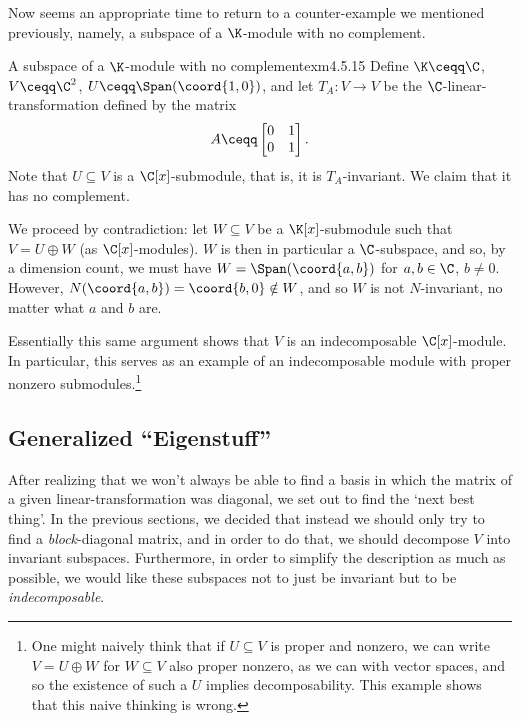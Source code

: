 Now seems an appropriate time to return to a counter-example we mentioned previously, namely, a subspace of a $\K$-module with no complement.
\begin{exm}{A subspace of a $\K$-module with no complement}{exm4.5.15}
	Define $\K \ceqq \C$, $V\ceqq \C ^2$, $U\ceqq \Span (\coord{1,0})$, and let $T_A\colon V\rightarrow V$ be the $\C$-linear-transformation defined by the matrix
	\begin{equation}
		A\ceqq \begin{bmatrix}0 & 1 \\ 0 & 1\end{bmatrix}.
	\end{equation}
	Note that $U\subseteq V$ is a $\C [x]$-submodule, that is, it is $T_A$-invariant.  We claim that it has no complement.
	
	We proceed by contradiction:  let $W\subseteq V$ be a $\K [x]$-submodule such that $V=U\oplus W$ (as $\C [x]$-modules).  $W$ is then in particular a $\C$-subspace, and so, by a dimension count, we must have $W=\Span (\coord{a,b})$ for $a,b\in \C$, $b\neq 0$.  However, $N(\coord{a,b})=\coord{b,0}\notin W$, and so $W$ is not $N$-invariant, no matter what $a$ and $b$ are.
	\begin{rmk}
		Essentially this same argument shows that $V$ is an indecomposable $\C [x]$-module.  In particular, this serves as an example of an indecomposable module with proper nonzero submodules.\footnote{One might naively think that if $U\subseteq V$ is proper and nonzero, we can write $V=U\oplus W$ for $W\subseteq V$ also proper nonzero, as we can with vector spaces, and so the existence of such a $U$ implies decomposability.  This example shows that this naive thinking is wrong.}
	\end{rmk}
\end{exm}

\subsection{Generalized ``Eigenstuff''}

After realizing that we won't always be able to find a basis in which the matrix of a given linear-transformation was diagonal, we set out to find the `next best thing'.  In the previous sections, we decided that instead we should only try to find a \emph{block}-diagonal matrix, and in order to do that, we should decompose $V$ into invariant subspaces.  Furthermore, in order to simplify the description as much as possible, we would like these subspaces not to just be invariant but to be \emph{indecomposable}.

